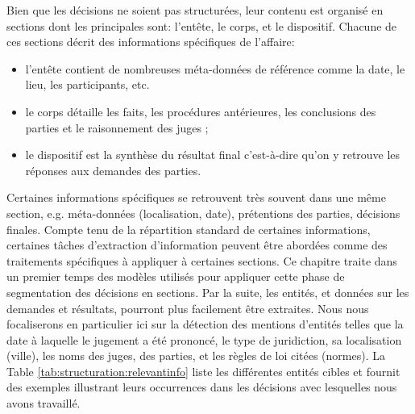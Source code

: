 Bien que les décisions ne soient pas structurées, leur contenu est organisé en sections dont les principales sont: l'entête, le corps, et le dispositif. Chacune de ces sections décrit des informations spécifiques de l'affaire: 
\begin{itemize}
	\item l'entête contient de nombreuses méta-données de référence comme la date, le lieu, les participants, etc.
	\item le corps détaille les faits, les procédures antérieures, les conclusions des parties et le raisonnement des juges ;
	\item le dispositif est la synthèse du résultat final c'est-à-dire qu'on y retrouve les réponses aux demandes des parties.
\end{itemize}

Certaines informations spécifiques se retrouvent très souvent dans une même section, e.g. méta-données (localisation, date), prétentions des parties, décisions finales. Compte tenu de la répartition standard de certaines informations, certaines tâches d'extraction d'information peuvent être abordées comme des traitements spécifiques à appliquer à certaines sections. Ce chapitre traite dans un premier temps des modèles utilisés pour appliquer cette phase de segmentation des décisions en sections. Par la suite, les entités, et données sur les demandes et résultats, pourront plus facilement être extraites. Nous nous focaliserons en particulier ici sur la détection des mentions d'entités telles que la date à laquelle le jugement a été prononcé, le type de juridiction, sa localisation (ville), les noms des juges, des parties, et les règles de loi citées (normes). La Table \ref{tab:structuration:relevantinfo} liste les différentes entités cibles et fournit des exemples illustrant leurs occurrences dans les décisions avec lesquelles nous avons travaillé.

